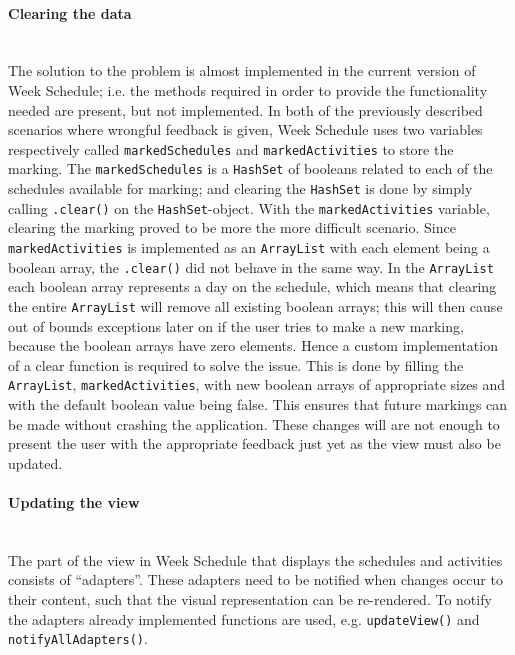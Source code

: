 \paragraph{Clearing the data}\hfill\\
The solution to the problem is almost implemented in the current version of Week Schedule; i.e. the methods required in order to provide the functionality needed are present, but not implemented.
In both of the previously described scenarios where wrongful feedback is given, Week Schedule uses two variables respectively called \texttt{markedSchedules} and \texttt{markedActivities} to store the marking.
The \texttt{markedSchedules} is a \texttt{HashSet} of booleans related to each of the schedules available for marking; and clearing the \texttt{HashSet} is done by simply calling \texttt{.clear()} on the \texttt{HashSet}-object.
With the \texttt{markedActivities} variable, clearing the marking proved to be more the more difficult scenario.
Since \texttt{markedActivities} is implemented as an \texttt{ArrayList} with each element being a boolean array, the \texttt{.clear()} did not behave in the same way.
In the \texttt{ArrayList} each boolean array represents a day on the schedule, which means that clearing the entire \texttt{ArrayList} will remove all existing boolean arrays; this will then cause out of bounds exceptions later on if the user tries to make a new marking, because the boolean arrays have zero elements. 
Hence a custom implementation of a clear function is required to solve the issue.
This is done by filling the \texttt{ArrayList}, \texttt{markedActivities}, with new boolean arrays of appropriate sizes and with the default boolean value being false.
This ensures that future markings can be made without crashing the application.
These changes will are not enough to present the user with the appropriate feedback just yet as the view must also be updated.

\paragraph{Updating the view}\hfill\\
The part of the view in Week Schedule that displays the schedules and activities consists of \enquote{adapters}.
These adapters need to be notified when changes occur to their content, such that the visual representation can be re-rendered.
To notify the adapters already implemented functions are used, e.g. \texttt{updateView()} and \texttt{notifyAllAdapters()}.


